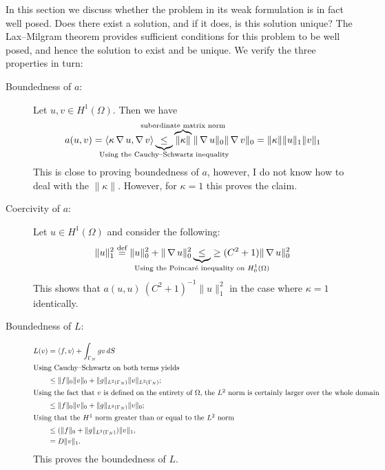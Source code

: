 In this section we discuss whether the problem in its weak formulation is
in fact well posed. Does there exist a solution, and if it does, is this
solution unique? The Lax--Milgram theorem provides sufficient conditions for
this problem to be well posed, and hence the solution to exist and be unique.
We verify the three properties in turn:
\begin{description}
    \item[Boundedness of \( a \):]
        Let \( u, v \in H^1(\Omega) \). Then we have
        \begin{equation}
            a(u, v) = \langle \kappa \grad u, \grad v\rangle
            \underbrace{\leq}_{\mathclap{\text{Using the Cauchy--Schwartz inequality}}} 
            \overbrace{\|\kappa\|}^{\mathclap{\text{subordinate matrix norm}}} 
            \| \grad u \|_0 \| \grad v \|_0
            = \|\kappa\| \| u \|_1 \| v \|_1
        \end{equation}
        This is close to proving boundedness of \( a \), however, I do not know
        how to deal with the \( \| \kappa \| \). However, for \( \kappa = 1\)
        this proves the claim.

    \item[Coercivity of \(a \):]
        Let \( u \in H^1 (\Omega) \) and consider the following:
        \begin{equation}
            \| u \|_1^2 \overset{\text{def}}{=} \| u \|_0^2 + \| \grad u \|_0^2
            \underbrace{\leq}_{\mathclap{\text{Using the Poincar\'e inequality
            on } H^1_0(\Omega)}} \geq (C^2 + 1) \| \grad u \|_0^2
        \end{equation}
        This shows that \( a(u, u) \ (C^2 + 1)^{-1} \| u \|_1^2 \) in the
        case where \( \kappa = 1 \) identically. 

    \item[Boundedness of \( L \):]
        \begin{align}
            L(v) &= \langle f, v \rangle + \int_{\Gamma_N} g v\, dS \\
            \shortintertext{Using Cauchy--Schwartz on both terms yields }
                 &\leq \| f\|_0 \| v \|_0 + \| g \|_{L^2(\Gamma_N)} \| v \|_{L^2(\Gamma_N)} ;\\
            \shortintertext{Using the fact that \( v \) is defined on the
            entirety of \( \Omega \), the \( L^2 \) norm is certainly larger
            over the whole domain}
                 &\leq \| f \|_0 \| v \|_0 + \|g\|_{L^2(\Gamma_N)} \| v \|_0;\\
            \shortintertext{Using that the \( H^1 \) norm greater than or equal
            to the \( L^2 \) norm}
                 &\leq (\| f\|_0 + \| g \|_{L^2(\Gamma_N)}) \| v \|_1,\\
                 &= D \| v \|_1.
        \end{align}
        This proves the boundedness of \( L \).
\end{description}
